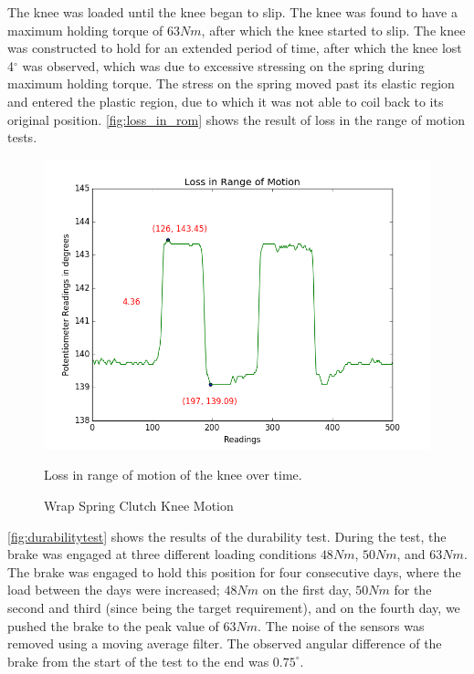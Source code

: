 The knee was loaded until the knee began to slip. The knee was found to have a maximum holding torque of $63Nm$, after which the knee started to slip. The knee was constructed to hold for an extended period of time, after which the knee lost 4$^{\circ}$ was observed, which was due to excessive stressing on the spring during maximum holding torque. The stress on the spring moved past its elastic region and entered the plastic region, due to which it was not able to coil back to its original position. \autoref{fig:loss_in_rom} shows the result of loss in the range of motion tests.
\begin{figure}[h!]
    \centering
    \includegraphics[scale=0.5]{ images/mech_design/loss_in_rom.png}
    \caption{Wrap Spring Clutch Knee Motion}{Loss in range of motion of the knee over time.}
    \label{fig:loss_in_rom}

\end{figure}

\autoref{fig:durabilitytest} shows the results of the durability test. During the test, the brake was engaged at three different loading conditions $48Nm$, $50Nm$, and $63Nm$. The brake was engaged to hold this position for four consecutive days, where the load between the days were increased; $48Nm$ on the first day, $50Nm$ for the second and third (since being the target requirement), and on the fourth day, we pushed the brake to the peak value of $63Nm$. The noise of the sensors was removed using a moving average filter. The observed angular difference of the brake from the start of the test to the end was $0.75^{\circ}$.


